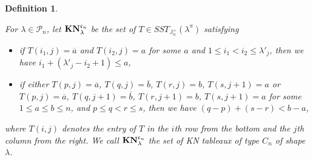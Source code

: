 \documentclass[leqno,11pt]{amsart}
\newtheorem{df}[thm]{\bf Definition}
\numberwithin{equation}{section}
\newcommand{\cP}{\mathscr{P}}
\newcommand{\ov}{\overline}
\newcommand{\mf}{\mathfrak}
\newcommand{\J}{\mathbb{J}}
\newcommand{\la}{\lambda}
\begin{document}
\begin{df}\label{def:KN-C}{\rm
For $\la\in \cP_n$, let ${\bf KN}^{\mf c_n}_{\la}$ be the set of $T\in SST_{\J_n^\times}(\la^\pi)$ satisfying  
\begin{itemize}
\item[(${\mf c}$-1)] if $T({i_1,j})=\ov{a}$ and $T({i_2,j})=a$ for some $a$ and $1\leq i_1< i_2\leq \la'_j$, then we have $i_1+(\la'_j-i_2+1)\leq a$,


\item[(${\mf c}$-2)] if either $T({p,j})=\ov{a}$, $T({q,j})=\ov{b}$, $T({r,j})=b$, $T({s,j+1})=a$ or 
 $T({p,j})=\ov{a}$, $T({q,j+1})=\ov{b}$, $T({r,j+1})=b$, $T({s,j+1})=a$ for some $1\leq a\leq b\leq n$, and $p\leq q<r\leq s$, then we have $(q-p)+(s-r)<b-a$,

\end{itemize}
where $T({i,j})$ denotes the entry of $T$ in the $i$th row from the bottom and the $j$th column from the right. We call ${\bf KN}^{\mf c_n}_{\la}$ the set of {\em KN tableaux of type $C_n$ of shape $\la$.}}
\end{df}
\end{document}
